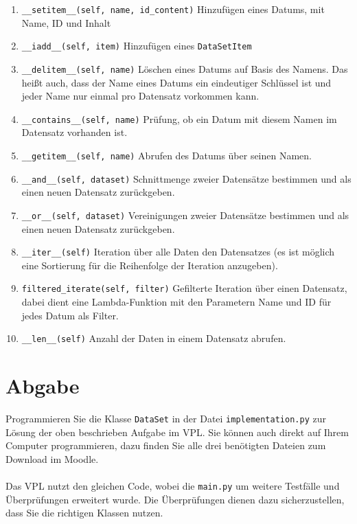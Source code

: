 \documentclass[a4paper]{article}
\begin{document}
\begin{enumerate}

    \item \verb|__setitem__(self, name, id_content)|
    Hinzufügen eines Datums, mit Name, ID und Inhalt

    \item \verb|__iadd__(self, item)|
    Hinzufügen eines \verb|DataSetItem|

    \item \verb|__delitem__(self, name)|
    Löschen eines Datums auf Basis des Namens.
    Das heißt auch, dass der Name eines Datums ein eindeutiger Schlüssel ist und jeder Name nur einmal pro Datensatz vorkommen kann.
    
    \item \verb|__contains__(self, name)|
    Prüfung, ob ein Datum mit diesem Namen im Datensatz vorhanden ist.
    
    \item \verb|__getitem__(self, name)|
    Abrufen des Datums über seinen Namen.
    
    \item \verb|__and__(self, dataset)|
    Schnittmenge zweier Datensätze bestimmen und als einen neuen Datensatz zurückgeben.
    
    \item \verb|__or__(self, dataset)|
    Vereinigungen zweier Datensätze bestimmen und als einen neuen Datensatz zurückgeben.
    
    \item \verb|__iter__(self)|
    Iteration über alle Daten den Datensatzes (es ist möglich eine Sortierung für die Reihenfolge der Iteration anzugeben).    
    
    \item \verb|filtered_iterate(self, filter)|
    Gefilterte Iteration über einen Datensatz, dabei dient eine Lambda-Funktion mit den Parametern Name und ID für jedes Datum als Filter.    
    
    \item \verb|__len__(self)|
    Anzahl der Daten in einem Datensatz abrufen.

\end{enumerate}

\section{Abgabe}

Programmieren Sie die Klasse \verb|DataSet| in der Datei \verb|implementation.py| zur Lösung der oben beschrieben Aufgabe im VPL.
Sie können auch direkt auf Ihrem Computer programmieren, dazu finden Sie alle drei benötigten Dateien zum Download im Moodle.\\
\\
Das VPL nutzt den gleichen Code, wobei die \verb|main.py| um weitere Testfälle und Überprüfungen erweitert wurde.
Die Überprüfungen dienen dazu sicherzustellen, dass Sie die richtigen Klassen nutzen.\\
\end{document}
